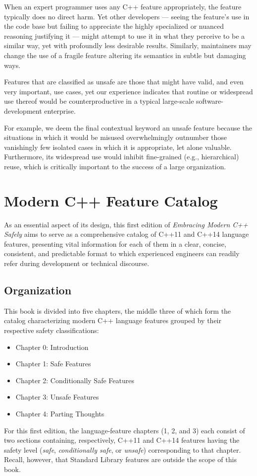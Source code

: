 When an expert programmer uses any C++ feature appropriately, the feature typically does no direct harm. Yet other developers --- seeing the feature’s use in the code base but failing to appreciate the highly specialized or nuanced reasoning justifying it --- might attempt to use it in what they perceive to be a similar way, yet with profoundly less desirable results. Similarly, maintainers may change the use of a fragile feature altering its semantics in subtle but damaging ways.

Features that are classified as unsafe are those that might have valid, and even very important, use cases, yet our experience indicates that routine or widespread use thereof would be counterproductive in a typical large-scale software-development enterprise.

For example, we deem the final contextual keyword an unsafe feature because the situations in which it would be misused overwhelmingly outnumber those vanishingly few isolated cases in which it is appropriate, let alone valuable. Furthermore, its widespread use would inhibit fine-grained (e.g., hierarchical) reuse, which is critically important to the success of a large organization.%

\section{Modern C++ Feature Catalog}

As an essential aspect of its design, this first edition of \textit{Embracing Modern C++ Safely} aims to serve as a comprehensive catalog of C++11 and C++14 language features, presenting vital information for each of them in a clear, concise, consistent, and predictable format to which experienced engineers can readily refer during development or technical discourse.

\subsection{Organization}

This book is divided into five chapters, the middle three of which form the catalog characterizing modern C++ language features grouped by their respective safety classifications:
\begin{itemize}
\item{ Chapter 0: Introduction}
\item{Chapter 1: Safe Features}
\item{Chapter 2: Conditionally Safe Features}
\item{Chapter 3: Unsafe Features}
\item{Chapter 4: Parting Thoughts}
\end{itemize}
For this first edition, the language-feature chapters (1, 2, and 3) each consist of two sections containing, respectively, C++11 and C++14 features having the safety level (\textit{safe}, \textit{conditionally safe}, or \textit{unsafe}) corresponding to that chapter. Recall, however, that Standard Library features are outside the scope of this book.

